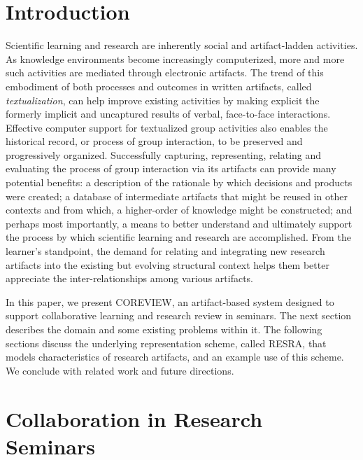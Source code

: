 \section{Introduction}

Scientific learning and research are inherently social and artifact-ladden
activities. As knowledge environments become increasingly computerized,
more and more such activities are mediated through electronic artifacts.
The trend of this embodiment of both processes and outcomes in written
artifacts, called {\it textualization}, can help improve existing
activities by making explicit the formerly implicit and uncaptured results
of verbal, face-to-face interactions. Effective computer support for
textualized group activities also enables the historical record, or process
of group interaction, to be preserved and progressively organized.
Successfully capturing, representing, relating and evaluating the process
of group interaction via its artifacts can provide many potential benefits:
a description of the rationale by which decisions and products were
created; a database of intermediate artifacts that might be reused in other
contexts and from which, a higher-order of knowledge might be constructed;
and perhaps most importantly, a means to better understand and ultimately
support the process by which scientific learning and research are
accomplished. From the learner's standpoint, the demand for relating and
integrating new research artifacts into the existing but evolving
structural context helps them better appreciate the inter-relationships
among various artifacts.

In this paper, we present COREVIEW,
an artifact-based system designed to support collaborative learning and
research review in seminars. The next section describes the domain and some
existing problems within it. The following sections discuss the underlying
representation scheme, called RESRA, that models characteristics of
research artifacts, and an example use of this scheme. We conclude with
related work and future directions.


\section{Collaboration in Research Seminars}

